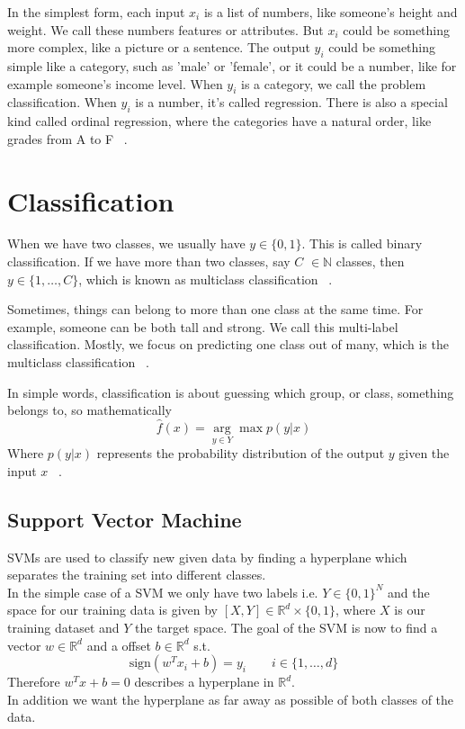 In the simplest form, each input 
$x_i$ is a list of numbers, like someone's height and weight. We call these numbers features or attributes. But $x_i$ could be something more complex, like a picture or a sentence. The output 
$y_i$ could be something simple like a category, such as 'male' or 'female', or it could be a number, like for example someone's income level. When $y_i$ is a category, we call the problem classification. When $y_i$ is a number, it's called regression. There is also a special kind called ordinal regression, where the categories have a natural order, like grades from A to F ~\cite{murphy2013machine}.

\section{Classification}

When we have two classes, we usually have \( y \in \{0, 1\} \). This is called binary classification. If we have more than two classes, say \( C \) $\in \mathbb{N}$ classes, then \( y \in \{1, \ldots, C\} \), which is known as multiclass classification ~\cite{murphy2013machine}.

Sometimes, things can belong to more than one class at the same time. For example, someone can be both tall and strong. We call this multi-label classification. Mostly, we focus on predicting one class out of many, which is the multiclass classification ~\cite{murphy2013machine}.

In simple words, classification is about guessing which group, or class, something belongs to, so mathematically
\begin{equation}
    \hat{f}(x) = \underset{y \in Y} \arg \max p(y|x)
\end{equation}
Where $p(y|x)$ represents the probability distribution of the output $y$ given the input $x$ ~\cite{murphy2013machine}.

\subsection{Support Vector Machine}

SVMs are used to classify new given data by finding a hyperplane which separates the training set into different classes.\\ 
In the simple case of a SVM we only have two labels i.e. $Y \in \{0,1 \}^N$ and the space for our training data is given by $[X , Y] \in \mathbb{R}^d \times \{0,1 \}$, where $X$ is our training dataset and $Y$ the target space. The goal of the SVM is now to find a vector $w \in \mathbb{R}^d$ and a offset $b \in\mathbb{R}^d $ s.t. 
\begin{equation}
    \mathrm{sign}(w^T x_i +b) = y_i \qquad i \in \{1, \dots, d\}
\end{equation}
Therefore $w^T x + b = 0$ describes a hyperplane in $\mathbb{R}^d$. \\
In addition we want the hyperplane as far away as possible of both classes of the data.

